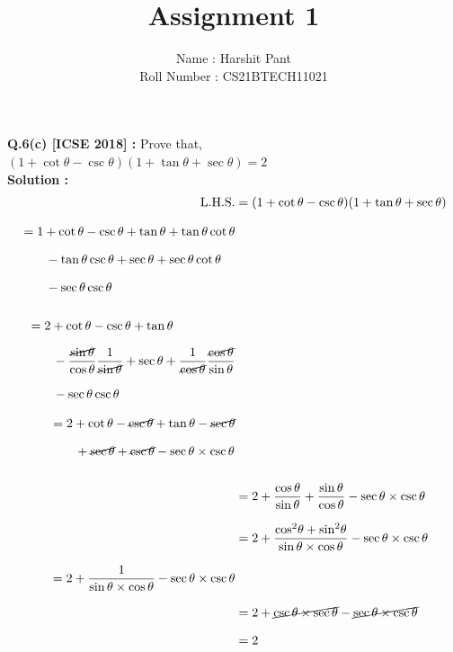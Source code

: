 \documentclass[journal,12pt,twocolumn]{IEEEtran}
\title{Assignment 1}
\author{\Large{Name : Harshit Pant}\\\Large{Roll Number : CS21BTECH11021}}
\date{}
\begin{document}
\maketitle
\setlength{\parindent}{0cm}
\textbf{Q.6(c) [ICSE 2018] :}
Prove that,\\[.1in]
$(1 +\cot\theta -\csc\theta)(1 + \tan\theta +\sec\theta)=2$\\[.1in]
\textbf{Solution : }
\begin{align}
\text{L.H.S.}&=(1+ \cot\theta -\csc\theta)(1+\tan\theta+\sec\theta)\\[.1in]
\begin{split}
&=1+\cot\theta-\csc\theta+\tan\theta+\tan\theta\cot\theta\\[.1in]
&\qquad-\tan\theta\csc\theta+\sec\theta+\sec\theta\cot\theta\\[.1in]
&\qquad-\sec\theta\csc\theta\\[.1in]
\end{split}\\[.1in]
\begin{split}
&=2+\cot\theta-\csc\theta+\tan\theta\\[.1in]
&\qquad
-\frac{\cancel{\sin\theta}}{\cos\theta}\frac{1}{\cancel{\sin\theta}}+\sec\theta+\frac{1}{\cancel{\cos\theta}}\frac{\cancel{\cos\theta}}{\sin\theta}\\[.1in]
&\qquad
-\sec\theta\csc\theta
\end{split}\\[.1in]
\begin{split}
&=2+\cot\theta-\cancel{\csc\theta}+\tan\theta-\cancel{\sec\theta}\\[.1in]
&\qquad+\cancel{\sec\theta}+\cancel{\csc\theta}-\sec\theta\times\csc\theta\\[.1in]
\end{split}\\[.1in]
&=2+\dfrac{\cos\theta}{\sin\theta}+\dfrac{\sin\theta}{\cos\theta}-\sec\theta\times\csc\theta\\[.1in]
&=2+\dfrac{{\cos}^2\theta+{\sin}^2\theta}{\sin\theta\times\cos\theta}-\sec\theta\times\csc\theta\\[.1in]
\begin{split}
&=2+\frac{1}{\sin\theta\times\cos\theta}-\sec\theta\times\csc\theta\\[.1in]
\end{split}\\
&=2+\cancel{\csc\theta\times\sec\theta}-\cancel{\sec\theta\times\csc\theta}\\[.1in]
&=2
\end{align}
\end{document}
